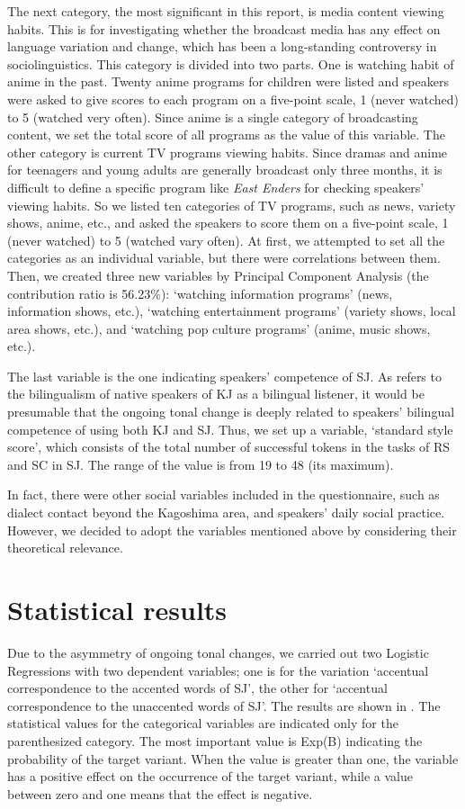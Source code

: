 \documentclass[output=paper]{LSP/langsci}
\begin{document}
The next category, the most significant in this report, is media content viewing habits. This is for investigating whether the broadcast media has any effect on language variation and change, which has been a long-standing controversy in sociolinguistics. This category is divided into two parts. One is watching habit of anime in the past. Twenty anime programs for children were listed and speakers were asked to give scores to each program on a five-point scale, 1 (never watched) to 5 (watched very often). Since anime is a single category of broadcasting content, we set the total score of all programs as the value of this variable. The other category is current TV programs viewing habits. Since dramas and anime for teenagers and young adults are generally broadcast only three months, it is difficult to define a specific program like \textit{East Enders} for checking speakers’ viewing habits. So we listed ten categories of TV programs, such as news, variety shows, anime, etc., and asked the speakers to score them on a five-point scale, 1 (never watched) to 5 (watched vary often). At first, we attempted to set all the categories as an individual variable, but there were correlations between them. Then, we created three new variables by Principal Component Analysis (the contribution ratio is 56.23\%): ‘watching information programs’ (news, information shows, etc.), ‘watching entertainment programs’ (variety shows, local area shows, etc.), and ‘watching pop culture programs’ (anime, music shows, etc.).  

The last variable is the one indicating speakers’ competence of SJ. As \citet[324]{kubozono_tonal_2007} refers to the bilingualism of native speakers of KJ as a bilingual listener, it would be presumable that the ongoing tonal change is deeply related to speakers’ bilingual competence of using both KJ and SJ. Thus, we set up a variable, ‘standard style score’, which consists of the total number of successful tokens in the tasks of RS and SC in SJ. The range of the value is from 19 to 48 (its maximum).

In fact, there were other social variables included in the questionnaire, such as dialect contact beyond the Kagoshima area, and speakers’ daily social practice. However, we decided to adopt the variables mentioned above by considering their theoretical relevance. 

\section{Statistical results}
Due to the asymmetry of ongoing tonal changes, we carried out two Logistic Regressions with two dependent variables; one is for the variation ‘accentual correspondence to the accented words of SJ’, the other for ‘accentual correspondence to the unaccented words of SJ’. The results are shown in . The statistical values for the categorical variables are indicated only for the parenthesized category. The most important value is Exp(B) indicating the probability of the target variant. When the value is greater than one, the variable has a positive effect on the occurrence of the target variant, while a value between zero and one means that the effect is negative.
\end{document}
